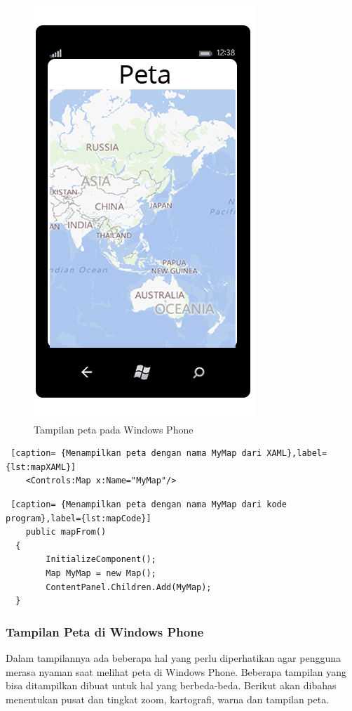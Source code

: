 \begin{figure}[h]
	\centering
		\includegraphics[scale=0.1]{Gambar/map}
	\caption{Tampilan peta pada Windows Phone}
	\label{fig:peta}
\end{figure}

\begin{lstlisting} [caption= {Menampilkan peta dengan nama MyMap dari XAML},label={lst:mapXAML}]
	<Controls:Map x:Name="MyMap"/>
\end{lstlisting}

\begin{lstlisting} [caption= {Menampilkan peta dengan nama MyMap dari kode program},label={lst:mapCode}]
	public mapFrom()
  {
		InitializeComponent();
		Map MyMap = new Map();
		ContentPanel.Children.Add(MyMap);
  }
\end{lstlisting}

\subsubsection{Tampilan Peta di Windows Phone}
\label{subsubsec:Tampilan Peta di Windows Phone}
\hspace{0.5cm} Dalam tampilannya ada beberapa hal yang perlu diperhatikan agar pengguna merasa nyaman saat melihat peta di Windows Phone. Beberapa tampilan yang bisa ditampilkan dibuat untuk hal yang berbeda-beda. Berikut akan dibahas menentukan pusat dan tingkat zoom, kartografi, warna dan tampilan peta.

